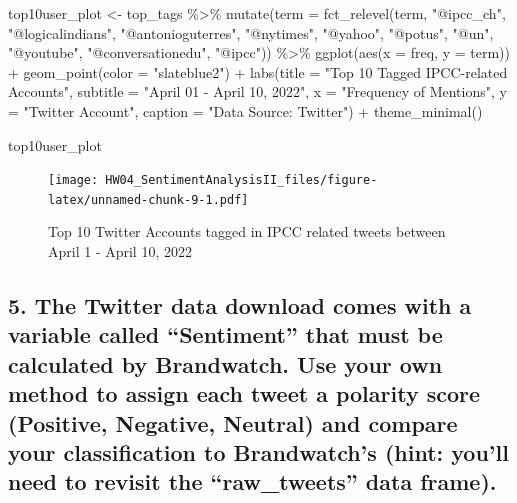 \documentclass[
]{article}
\newenvironment{Shaded}{\begin{snugshade}}{\end{snugshade}}
\newcommand{\AttributeTok}[1]{\textcolor[rgb]{0.77,0.63,0.00}{#1}}
\newcommand{\FunctionTok}[1]{\textcolor[rgb]{0.00,0.00,0.00}{#1}}
\newcommand{\NormalTok}[1]{#1}
\newcommand{\OtherTok}[1]{\textcolor[rgb]{0.56,0.35,0.01}{#1}}
\newcommand{\SpecialCharTok}[1]{\textcolor[rgb]{0.00,0.00,0.00}{#1}}
\newcommand{\StringTok}[1]{\textcolor[rgb]{0.31,0.60,0.02}{#1}}
\begin{document}
\begin{Shaded}
\begin{Highlighting}[]
\NormalTok{top10user\_plot }\OtherTok{\textless{}{-}}\NormalTok{ top\_tags }\SpecialCharTok{\%\textgreater{}\%} 
  \FunctionTok{mutate}\NormalTok{(}\AttributeTok{term =} \FunctionTok{fct\_relevel}\NormalTok{(term, }
            \StringTok{"@ipcc\_ch"}\NormalTok{, }\StringTok{"@logicalindians"}\NormalTok{, }\StringTok{"@antonioguterres"}\NormalTok{, }\StringTok{"@nytimes"}\NormalTok{, }\StringTok{"@yahoo"}\NormalTok{, }\StringTok{"@potus"}\NormalTok{, }\StringTok{"@un"}\NormalTok{, }\StringTok{"@youtube"}\NormalTok{, }\StringTok{"@conversationedu"}\NormalTok{, }\StringTok{"@ipcc"}\NormalTok{)) }\SpecialCharTok{\%\textgreater{}\%}
  \FunctionTok{ggplot}\NormalTok{(}\FunctionTok{aes}\NormalTok{(}\AttributeTok{x =}\NormalTok{ freq, }\AttributeTok{y =}\NormalTok{ term)) }\SpecialCharTok{+}
  \FunctionTok{geom\_point}\NormalTok{(}\AttributeTok{color =} \StringTok{"slateblue2"}\NormalTok{) }\SpecialCharTok{+}
  \FunctionTok{labs}\NormalTok{(}\AttributeTok{title =} \StringTok{"Top 10 Tagged IPCC{-}related Accounts"}\NormalTok{,}
       \AttributeTok{subtitle =} \StringTok{"April 01 {-} April 10, 2022"}\NormalTok{,}
       \AttributeTok{x =} \StringTok{"Frequency of Mentions"}\NormalTok{,}
       \AttributeTok{y =} \StringTok{"Twitter Account"}\NormalTok{,}
       \AttributeTok{caption =} \StringTok{"Data Source: Twitter"}\NormalTok{) }\SpecialCharTok{+}
  \FunctionTok{theme\_minimal}\NormalTok{() }

\NormalTok{top10user\_plot}
\end{Highlighting}
\end{Shaded}

\begin{figure}
\centering
\texttt{[image: HW04\_SentimentAnalysisII\_files/figure-latex/unnamed-chunk-9-1.pdf]}
\caption{Top 10 Twitter Accounts tagged in IPCC related tweets between
April 1 - April 10, 2022}
\end{figure}

\hypertarget{the-twitter-data-download-comes-with-a-variable-called-sentiment-that-must-be-calculated-by-brandwatch.-use-your-own-method-to-assign-each-tweet-a-polarity-score-positive-negative-neutral-and-compare-your-classification-to-brandwatchs-hint-youll-need-to-revisit-the-raw_tweets-data-frame.}{%
\subsection{5. The Twitter data download comes with a variable called
``Sentiment'' that must be calculated by Brandwatch. Use your own method
to assign each tweet a polarity score (Positive, Negative, Neutral) and
compare your classification to Brandwatch's (hint: you'll need to
revisit the ``raw\_tweets'' data
frame).}\label{the-twitter-data-download-comes-with-a-variable-called-sentiment-that-must-be-calculated-by-brandwatch.-use-your-own-method-to-assign-each-tweet-a-polarity-score-positive-negative-neutral-and-compare-your-classification-to-brandwatchs-hint-youll-need-to-revisit-the-raw_tweets-data-frame.}}
\end{document}
